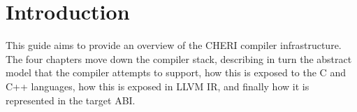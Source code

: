 \section*{Introduction}

This guide aims to provide an overview of the CHERI compiler infrastructure.
The four chapters move down the compiler stack, describing in turn the abstract model that the compiler attempts to support, how this is exposed to the C and C++ languages, how this is exposed in LLVM IR, and finally how it is represented in the target ABI.

